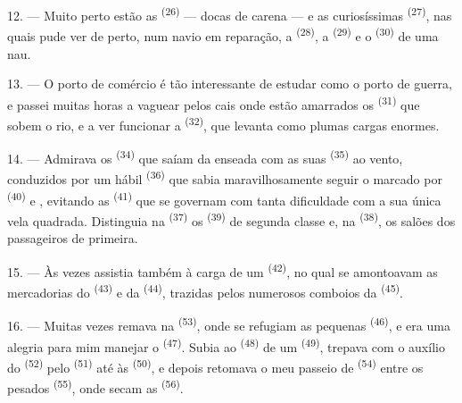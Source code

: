 12. --- Muito perto estão as  \textsuperscript{(26)} --- docas
de carena --- e as curiosíssimas 
\textsuperscript{(27)}, nas quais pude ver de perto, num navio em reparação, a
 \textsuperscript{(28)}, a  \textsuperscript{(29)} e o
 \textsuperscript{(30)} de uma nau.

13. --- O porto de comércio é tão interessante de estudar como o porto de
guerra, e passei muitas horas a vaguear pelos cais onde estão amarrados
os  \textsuperscript{(31)} que sobem o rio, e a ver
funcionar a  \textsuperscript{(32)}, que levanta como plumas cargas
enormes.

\VUsaut{4.0mm}
\VUsaut{3.0mm}

14. --- Admirava os  \textsuperscript{(34)} que saíam da
enseada com as suas  \textsuperscript{(35)} ao vento, conduzidos
por um hábil  \textsuperscript{(36)} que sabia maravilhosamente
seguir o  marcado por  \textsuperscript{(40)} e
, evitando as  \textsuperscript{(41)} que se
governam com tanta dificuldade com a sua única vela quadrada. Distinguia
na  \textsuperscript{(37)} os  \textsuperscript{(39)} de
segunda classe e, na  \textsuperscript{(38)}, os salões dos
passageiros de primeira.

15. --- Às vezes assistia também à carga de um 
\textsuperscript{(42)}, no qual se amontoavam as mercadorias do 
\textsuperscript{(43)} e da  \textsuperscript{(44)}, trazidas
pelos numerosos comboios da  \textsuperscript{(45)}.

\VUsaut{3.0mm}
\VUsaut{3.0mm}

16. --- Muitas vezes remava na  \textsuperscript{(53)},
onde se refugiam as pequenas  \textsuperscript{(46)}, e era
uma alegria para mim manejar o  \textsuperscript{(47)}. Subia ao
 \textsuperscript{(48)} de um 
\textsuperscript{(49)}, trepava com o auxílio do 
\textsuperscript{(52)} pelo  \textsuperscript{(51)} até às 
\textsuperscript{(50)}, e depois retomava o meu passeio de 
\textsuperscript{(54)} entre os pesados 
\textsuperscript{(55)}, onde secam as  \textsuperscript{(56)}.

